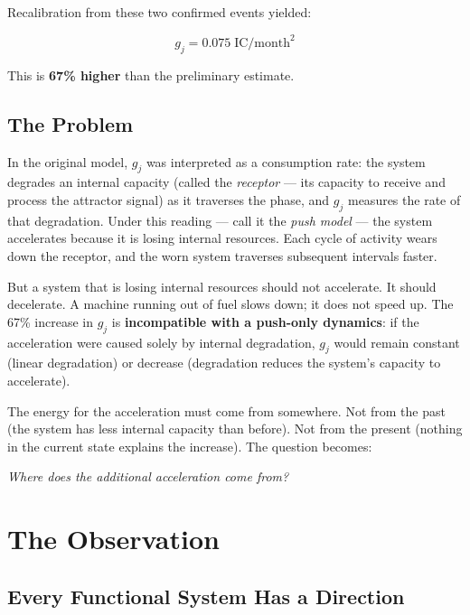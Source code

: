 \documentclass[12pt,a4paper]{article}
\newcommand{\gj}{g_j}
\begin{document}
Recalibration from these two confirmed events yielded:

\begin{equation}\label{eq:gj_empirical}
\gj = 0.075 \;\mathrm{IC/month}^2
\end{equation}

\noindent This is \textbf{67\% higher} than the preliminary estimate.

\subsection{The Problem}

In the original model, $\gj$ was interpreted as a consumption rate: the system degrades an internal capacity (called the \emph{receptor} --- its capacity to receive and process the attractor signal) as it traverses the phase, and $\gj$ measures the rate of that degradation. Under this reading --- call it the \emph{push model} --- the system accelerates because it is losing internal resources. Each cycle of activity wears down the receptor, and the worn system traverses subsequent intervals faster.

But a system that is losing internal resources should not accelerate. It should decelerate. A machine running out of fuel slows down; it does not speed up. The 67\% increase in $\gj$ is \textbf{incompatible with a push-only dynamics}: if the acceleration were caused solely by internal degradation, $\gj$ would remain constant (linear degradation) or decrease (degradation reduces the system's capacity to accelerate).

The energy for the acceleration must come from somewhere. Not from the past (the system has less internal capacity than before). Not from the present (nothing in the current state explains the increase). The question becomes:

\begin{center}
\emph{Where does the additional acceleration come from?}
\end{center}


\section{The Observation}

\subsection{Every Functional System Has a Direction}
\end{document}
